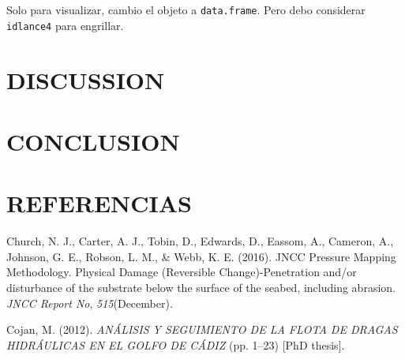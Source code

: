 \documentclass[
]{article}
\newlength{\cslhangindent}
\newlength{\cslentryspacingunit} %
\newenvironment{CSLReferences}[2] %
 {%
  \setlength{\parindent}{0pt}
  \ifodd #1
  \let\oldpar\par
  \def\par{\hangindent=\cslhangindent\oldpar}
  \fi
  \setlength{\parskip}{#2\cslentryspacingunit}
 }%
 {}
\begin{document}
Solo para visualizar, cambio el objeto a \texttt{data.frame}. Pero debo considerar \texttt{idlance4} para engrillar.

\hypertarget{discussion}{%
\section{DISCUSSION}\label{discussion}}

\hypertarget{conclusion}{%
\section{CONCLUSION}\label{conclusion}}

\newpage

\hypertarget{referencias}{%
\section*{REFERENCIAS}\label{referencias}}

\hypertarget{refs}{}
\begin{CSLReferences}{1}{0}
\leavevmode{}%
Church, N. J., Carter, A. J., Tobin, D., Edwards, D., Eassom, A., Cameron, A., Johnson, G. E., Robson, L. M., \& Webb, K. E. (2016). {JNCC Pressure Mapping Methodology. Physical Damage (Reversible Change)-Penetration and/or disturbance of the substrate below the surface of the seabed, including abrasion}. \emph{JNCC Report No}, \emph{515}(December).

\leavevmode{}%
Cojan, M. (2012). \emph{{AN{Á}LISIS Y SEGUIMIENTO DE LA FLOTA DE DRAGAS HIDR{Á}ULICAS EN EL GOLFO DE C{Á}DIZ}} (pp. 1--23) {[}PhD thesis{]}.

\end{CSLReferences}
\end{document}
